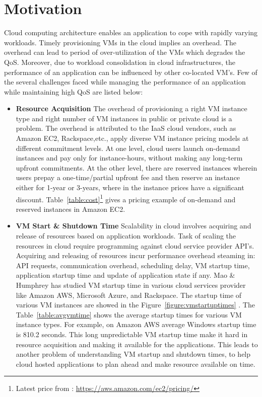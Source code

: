 \section{Motivation}
\label{sec:Motivation}
Cloud computing architecture enables an application to cope with rapidly varying workloads. Timely provisioning VMs in the cloud implies an overhead. The overhead can lead to period of over-utilization of the VMs which degrades the QoS. Moreover, due to workload consolidation in cloud infrastructures, the performance of an application can be influenced by other co-located VM's. Few of the several challenges faced while managing the performance of an application while maintaining high QoS are listed below:
\begin{itemize}
  \item \textbf{Resource Acquisition} The overhead of provisioning a right VM instance type and right number of VM instances in public or private cloud is a problem. The overhead is attributed to the IaaS cloud vendors, such as Amazon EC2\cite{amazon2010amazon}, Rackspace\cite{rackspace2010inc},etc., apply diverse VM instance pricing models at different commitment levels. At one level, cloud users launch on-demand instances and pay only for instance-hours, without making any long-term upfront commitments. At the other level, there are reserved instances wherein users prepay a one-time/partial upfront fee and then reserve an instance either for 1-year or 3-years, where in the instance prices have a significant discount. Table~\ref{table:cost}\footnote{Latest price from : \url{https://aws.amazon.com/ec2/pricing/}} gives a pricing example of on-demand and reserved instances in Amazon EC2.
  \item \textbf{VM Start \& Shutdown Time} Scalability in cloud involves acquiring and release of resources based on application workloads\cite{roy2011efficient}. Task of scaling the resources in cloud require programming against cloud service provider API's. Acquiring and releasing of resources incur performance overhead steaming in: API requests, communication overhead, scheduling delay, VM startup time, application startup time and update of application state if any\cite{roy2011efficient}. Mao \& Humphrey\cite{mao2012performance} has studied VM startup time in various cloud services provider like Amazon AWS, Microsoft Azure, and Rackspace. The startup time of various VM instances are showed in the Figure~\ref{figure:vmstartuptimes} . The Table~\ref{table:avgvmtime} shows the average startup times for various VM instance types. For example, on Amazon AWS average Windows startup time is 810.2 seconds. This long unpredictable VM startup time make it hard in resource acquisition and making it available for the applications. This leads to another problem of understanding VM startup and shutdown times, to help cloud hosted applications to plan ahead and make resource available on time.

\end{itemize}
